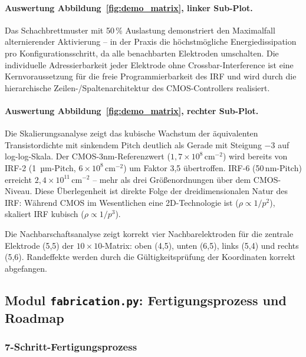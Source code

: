 ﻿\documentclass[a4paper,12pt]{scrreprt}
\theoremstyle{definition}
\begin{document}
\paragraph{Auswertung Abbildung~\ref{fig:demo_matrix}, linker Sub-Plot.}
Das Schachbrettmuster mit 50\,\% Auslastung demonstriert den Maximalfall
alternierender Aktivierung -- in der Praxis die höchstmögliche Energiedissipation
pro Konfigurationsschritt, da alle benachbarten Elektroden umschalten.
Die individuelle Adressierbarkeit jeder Elektrode ohne Crossbar-Interference
ist eine Kernvoraussetzung für die freie Programmierbarkeit des IRF und wird
durch die hierarchische Zeilen-/Spaltenarchitektur des CMOS-Controllers realisiert.

\paragraph{Auswertung Abbildung~\ref{fig:demo_matrix}, rechter Sub-Plot.}
Die Skalierungsanalyse zeigt das kubische Wachstum der äquivalenten Transistordichte
mit sinkendem Pitch deutlich als Gerade mit Steigung $-3$ auf log-log-Skala.
Der CMOS-3nm-Referenzwert ($1{,}7 \times 10^8$\,cm$^{-2}$) wird bereits von
IRF-2 (1\, µm-Pitch, $6 \times 10^8$\,cm$^{-2}$) um Faktor 3,5 übertroffen.
IRF-6 (50\,nm-Pitch) erreicht $2{,}4 \times 10^{11}$\,cm$^{-2}$ -- mehr als
drei Größenordnungen über dem CMOS-Niveau. Diese Überlegenheit ist direkte
Folge der dreidimensionalen Natur des IRF: Während CMOS im Wesentlichen eine
2D-Technologie ist ($\rho \propto 1/p^2$), skaliert IRF kubisch ($\rho \propto 1/p^3$).

Die Nachbarschaftsanalyse zeigt korrekt vier Nachbarelektroden für
die zentrale Elektrode (5,5) der $10 \times 10$-Matrix: oben (4,5),
unten (6,5), links (5,4) und rechts (5,6). Randeffekte werden durch
die Gültigkeitsprüfung der Koordinaten korrekt abgefangen.

\subsection{Modul \texttt{fabrication.py}: Fertigungsprozess und Roadmap}
\label{subsec:demo_fabrication}

\subsubsection{7-Schritt-Fertigungsprozess}
\end{document}
